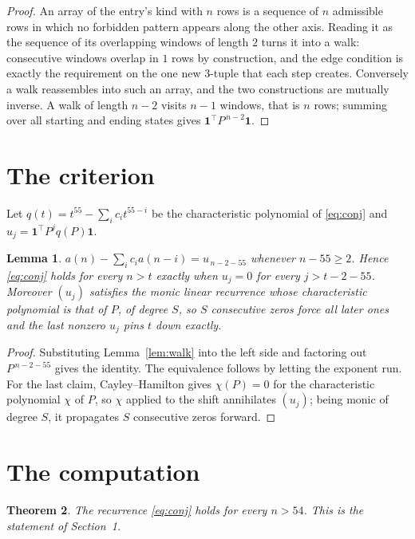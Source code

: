 \documentclass[11pt,a4paper]{article}
\theoremstyle{plain}
\newtheorem{theorem}{Theorem}
\newtheorem{lemma}[theorem]{Lemma}
\theoremstyle{definition}
\begin{document}
\begin{proof}
An array of the entry's kind with $n$ rows is a sequence of $n$ admissible rows in
which no forbidden pattern appears along the other axis. Reading it as the sequence of its
overlapping windows of length $2$ turns it into a walk: consecutive windows overlap in
$1$ rows by construction, and the edge condition is exactly the requirement on the one
new $3$-tuple that each step creates. Conversely a walk reassembles into such an array,
and the two constructions are mutually inverse. A walk of length $n-2$ visits $n-1$
windows, that is $n$ rows; summing over all starting and ending states gives
$\mathbf{1}^{\!\top}P^{\,n-2}\mathbf{1}$.
\end{proof}

\section{The criterion}

Let $q(t)=t^{55}-\sum_i c_i t^{55-i}$ be the characteristic polynomial of
\eqref{eq:conj} and $u_j=\mathbf{1}^{\!\top}P^{j}q(P)\mathbf{1}$.

\begin{lemma}\label{lem:crit}
$a(n)-\sum_i c_i a(n-i)=u_{\,n-2-55}$ whenever $n-55\ge2$. Hence
\eqref{eq:conj} holds for every $n>t$ exactly when $u_j=0$ for every
$j>t-2-55$. Moreover $(u_j)$ satisfies the monic linear recurrence whose
characteristic polynomial is that of $P$, of degree $S$, so $S$ consecutive zeros force all
later ones and the last nonzero $u_j$ pins $t$ down exactly.
\end{lemma}

\begin{proof}
Substituting Lemma~\ref{lem:walk} into the left side and factoring out
$P^{\,n-2-55}$ gives the identity. The equivalence follows by letting the exponent
run. For the last claim, Cayley--Hamilton gives $\chi(P)=0$ for the characteristic
polynomial $\chi$ of $P$, so $\chi$ applied to the shift annihilates $(u_j)$; being monic of
degree $S$, it propagates $S$ consecutive zeros forward.
\end{proof}

\section{The computation}

\begin{theorem}
The recurrence \eqref{eq:conj} holds for every $n>54$. This is the statement of
Section~1.
\end{theorem}
\end{document}
